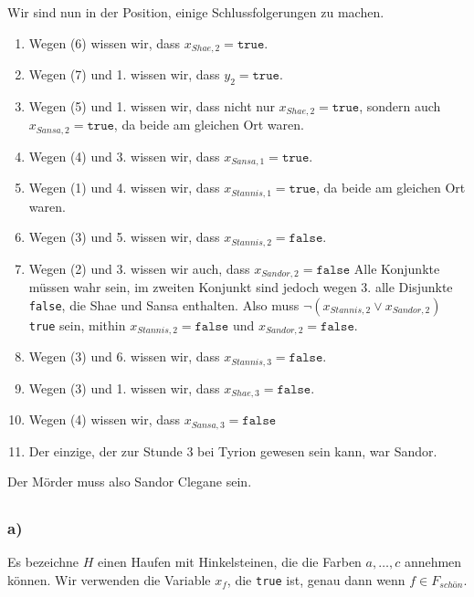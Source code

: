 \documentclass{article}
\begin{document}
Wir sind nun in der Position, einige Schlussfolgerungen zu machen.
\renewcommand{\labelenumi}{\arabic{enumi}.}
\begin{enumerate}
   \item Wegen (6) wissen wir, dass $x_{Shae,2}=\texttt{true}$.
   \item Wegen (7) und 1. wissen wir, dass $y_2 = \texttt{true}$.
   \item Wegen (5) und 1. wissen wir, dass nicht nur $x_{Shae,2}=\texttt{true}$,
      sondern auch $x_{Sansa,2}=\texttt{true}$, da beide am gleichen Ort waren.
   \item Wegen (4) und 3. wissen wir, dass $x_{Sansa,1}=\texttt{true}$.
   \item Wegen (1) und 4. wissen wir, dass $x_{Stannis,1}=\texttt{true}$, da
      beide am gleichen Ort waren.
   \item Wegen (3) und 5. wissen wir, dass $x_{Stannis,2}=\texttt{false}$. 
   \item Wegen (2) und 3. wissen wir auch, dass $x_{Sandor,2}=\texttt{false}$ 
      Alle Konjunkte
      müssen wahr sein, im zweiten Konjunkt sind jedoch wegen 3. alle Disjunkte
      \texttt{false}, die Shae und Sansa enthalten. Also muss
      $\neg(x_{Stannis,2} \vee x_{Sandor,2})$ \texttt{true} sein, mithin
      $x_{Stannis,2}=\texttt{false}$ und $x_{Sandor,2}=\texttt{false}$. 
   \item Wegen (3) und 6. wissen wir, dass $x_{Stannis,3}=\texttt{false}$.
   \item Wegen (3) und 1. wissen wir, dass $x_{Shae,3}=\texttt{false}$.
   \item Wegen (4) wissen wir, dass $x_{Sansa,3}=\texttt{false}$
   \item Der einzige, der zur Stunde 3 bei Tyrion gewesen sein kann, war Sandor.
\end{enumerate}

Der Mörder muss also Sandor Clegane sein.

\subsection{} 

\subsubsection{a)}

Es bezeichne $H$ einen Haufen mit Hinkelsteinen, die die Farben $a,\ldots,c$
annehmen können. Wir verwenden die Variable $x_f$, die \texttt{true} ist, genau
dann wenn $f \in F_{schön}$.
\end{document}
